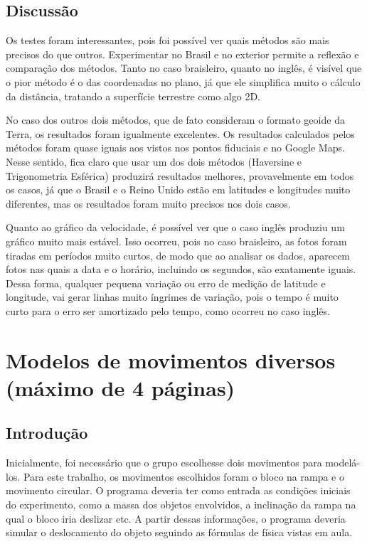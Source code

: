 \documentclass{article}
\begin{document}
\subsection{Discussão}

\qquad Os testes foram interessantes, pois foi possível ver quais métodos são mais precisos do que outros. Experimentar no Brasil e no exterior permite a reflexão e comparação dos métodos. Tanto no caso braisleiro, quanto no inglês, é visível que o pior método é o das coordenadas no plano, já que ele simplifica muito o cálculo da distância, tratando a superfície terrestre como algo 2D.

\qquad No caso dos outros dois métodos, que de fato consideram o formato geoide da Terra, os resultados foram igualmente excelentes. Os resultados calculados pelos métodos foram quase iguais aos vistos nos pontos fiduciais e no Google Maps. Nesse sentido, fica claro que usar um dos dois métodos (Haversine e Trigonometria Esférica) produzirá resultados melhores, provavelmente em todos os casos, já que o Brasil e o Reino Unido estão em latitudes e longitudes muito diferentes, mas os resultados foram muito precisos nos dois casos.

\qquad Quanto ao gráfico da velocidade, é possível ver que o caso inglês produziu um gráfico muito mais estável. Isso ocorreu, pois no caso braisleiro, as fotos foram tiradas em períodos muito curtos, de modo que ao analisar os dados, aparecem fotos nas quais a data e o horário, incluindo os segundos, são exatamente iguais. Dessa forma, qualquer pequena variação ou erro de medição de latitude e longitude, vai gerar linhas muito íngrimes de variação, pois o tempo é muito curto para o erro ser amortizado pelo tempo, como ocorreu no caso inglês.

\newpage

\section{Modelos de movimentos diversos (máximo de 4 páginas)}

\subsection{Introdução}

\qquad Inicialmente, foi necessário que o grupo escolhesse dois movimentos para modelá-los. Para este trabalho, os movimentos escolhidos foram o bloco na rampa e o movimento circular. O programa deveria ter como entrada as condições iniciais do experimento, como a massa dos objetos envolvidos, a inclinação da rampa na qual o bloco iria deslizar etc. A partir dessas informações, o programa deveria simular o deslocamento do objeto seguindo as fórmulas de física vistas em aula.
\end{document}
